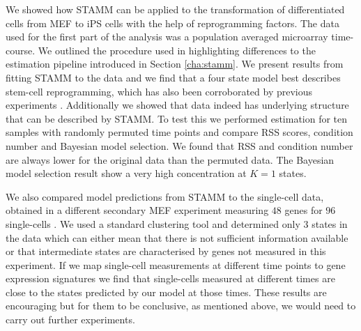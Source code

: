 We showed how STAMM can be applied to the transformation of differentiated cells from MEF to iPS cells with the help of reprogramming factors. The data used for the first part of the analysis was a population averaged microarray time-course. We outlined the procedure used in \cite{Armond:2013} highlighting differences to the estimation pipeline introduced in Section \ref{cha:stamm}. We present results from fitting STAMM to the data and we find that a four state model best describes stem-cell reprogramming, which has also been corroborated by previous experiments \cite{SamavarchiTehrani:2010cp}. Additionally we showed that data indeed has underlying  structure that can be described by STAMM. To test this we performed estimation for ten samples with randomly permuted time points and compare RSS scores, condition number and Bayesian model selection. We found that RSS and condition number are always lower for the original data than the permuted data. The Bayesian model selection result show a very high concentration at $K=1$ states. 

We also compared model predictions from STAMM to the single-cell data, obtained in a different secondary MEF experiment measuring $48$ genes for $96$ single-cells \citep{Buganim:2012hp}. We used a standard clustering tool and determined only $3$ states in the data which can either mean that there is not sufficient information available or that intermediate states are characterised by genes not measured in this experiment. If we map single-cell measurements at different time points to gene expression signatures we find that single-cells measured at different times are close to the states predicted by our model at those times. These results are encouraging but for them to be conclusive, as mentioned above, we would need to carry out further experiments. 


